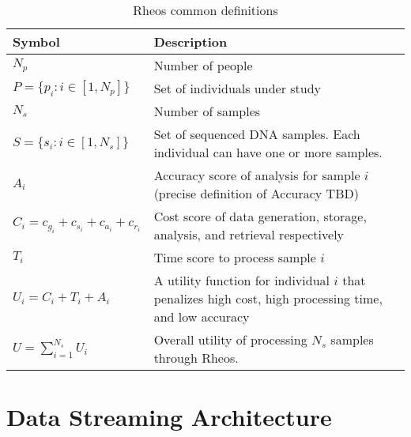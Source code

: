 \begin{table}[!ht]
    \caption{Rheos common definitions}
    \label{tab:rheos_notation}
    {\begin{tabular}{lp{7cm}}
    \toprule
    Symbol & Description \\
    \midrule
    $N_p$ & Number of people \\
    $P = \{p_i : i \in [1,N_p]\}$ & Set of individuals under study \\
    $N_s$ & Number of samples \\
    $S = \{s_i : i \in [1,N_s]\}$ & Set of sequenced DNA samples. Each individual can have one or more samples. \\
    $A_i $ & Accuracy score of analysis for sample $i$ (precise definition of Accuracy TBD) \\
    $C_i = c_{g_i} + c_{s_i} + c_{a_i} + c_{r_i}$ & Cost score of data generation, storage, analysis, and retrieval respectively \\
    $T_i$ & Time score to process sample $i$ \\
    $U_i = C_i + T_i + A_i$ & A utility function for individual $i$ that penalizes high cost, high processing time, and low accuracy\\
    $U = \sum_{i=1}^{N_s} U_i$ & Overall utility of processing $N_s$ samples through Rheos.\\
    \bottomrule
    \end{tabular}}
\end{table}


\section{Data Streaming Architecture}
\label{sec:rheos_streaming_architecture}

